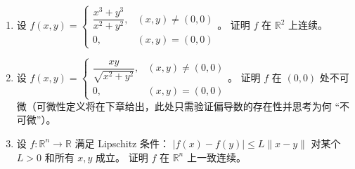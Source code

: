\documentclass[lang=cn,11pt]{elegantbook}
\begin{document}
\begin{exercise}[提高：连续性综合]
\begin{enumerate}
  \item[(1)] 设 $f(x,y)=\begin{cases}\dfrac{x^3+y^3}{x^2+y^2},&(x,y) \neq (0,0)\\0,&(x,y)=(0,0)\end{cases}$。
        证明 $f$ 在 $\mathbb{R}^2$ 上连续。
  \item[(2)] 设 $f(x,y)=\begin{cases}\dfrac{xy}{\sqrt{x^2+y^2}},&(x,y) \neq (0,0)\\0,&(x,y)=(0,0)\end{cases}$。
        证明 $f$ 在 $(0,0)$ 处不可微（可微性定义将在下章给出，此处只需验证偏导数的存在性并思考为何 ``不可微''）。
  \item[(3)] 设 $f:\mathbb{R}^n\to\mathbb{R}$ 满足 Lipschitz 条件：
        $|f(x)-f(y)|\leqslant  L\|x-y\|$ 对某个 $L>0$ 和所有 $x,y$ 成立。
        证明 $f$ 在 $\mathbb{R}^n$ 上一致连续。
\end{enumerate}
\end{exercise}
\end{document}
